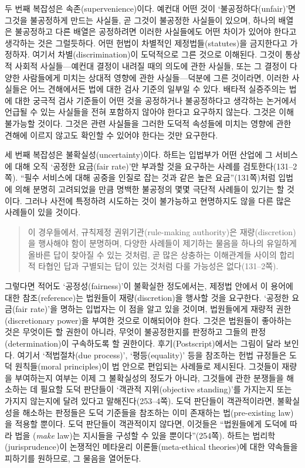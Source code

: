 두 번째 복잡성은 속존(supervenience)이다. 예컨대 어떤 것이
‘불공정하다(unfair)’면 그것을 불공정하게 만드는 사실들, 곧 그것이
불공정한  사실들이 있으며, 하나의
배열은 불공정하고 다른 배열은 공정하려면 이러한 사실들에도 어떤 차이가
있어야 한다고 생각하는 것은 그럴듯하다. 어떤 헌법이 차별적인
제정법들(statutes)을 금지한다고 가정하자. 여기서 차별(discrimination)이
도덕적으로 그른 것으로 이해된다. 그것이 통상적 사회적 사실들---예컨대
결정이 내려질 때의 의도에 관한 사실들, 또는 그 결정이 다양한 사람들에게
미치는 상대적 영향에 관한 사실들---덕분에 그른 것이라면, 이러한 사실들은
어느 견해에서든 법에 대한 검사 기준의 일부일 수 있다. 배타적 실증주의는
법에 대한 궁극적 검사 기준들이 어떤 것을 공정하거나 불공정하다고
생각하는 논거에서 언급될 수 있는 사실들을 전혀 포함하지 않아야 한다고
요구하지 않는다. 그것은 이해 불가능할 것이다. 그것은 관련 사실들을
그러한 도덕적 속성들에 미치는 영향에 관한 견해에 이르지 않고도 확인할 수
있어야 한다는 것만 요구한다.

세 번째 복잡성은 불확실성(uncertainty)이다. 하트는 입법부가 어떤 산업에
그 서비스에 대해 오직 ‘공정한 요금(fair rate)’만 부과할 것을 요구하는
사례를 검토한다(131--2쪽). “필수 서비스에 대해 공중을 인질로 잡는 것과
같은 높은 요금”(131쪽)처럼 입법에 의해 분명히 고려되었을 만큼 명백한
불공정의 몇몇 극단적 사례들이 있기는 할 것이다. 그러나 사전에 특정하려
시도하는 것이 불가능하고 현명하지도 않을 다른 많은 사례들이 있을 것이다.

\begin{quote}
이 경우들에서, 규칙제정 권위기관(rule-making authority)은
재량(discretion)을 행사해야 함이 분명하며, 다양한 사례들이 제기하는
물음을 하나의 유일하게 올바른 답이 찾아질 수 있는 것처럼, 곧 많은
상충하는 이해관계들 사이의 합리적 타협인 답과 구별되는 답이 있는 것처럼
다룰 가능성은 없다(131--2쪽).
\end{quote}

그렇다면 적어도 ‘공정성(fairness)’이 불확실한 정도에서는, 제정법 안에서
이 용어에 대한 참조(reference)는 법원들이 재량(discretion)을 행사할 것을
요구한다. ‘공정한 요금(fair rate)’을 명하는 입법자는 이 점을 알고 있을
것이며, 법원들에게 재량적 권한(discretionary power)을 부여한 것으로
이해되어야 한다. 그것은 법원들이 좋아하는 것은 무엇이든 할 권한이
아니라, 무엇이 불공정한지를 판정하고 그들의 판정(determination)이
구속하도록 할 권한이다. 후기(Postscript)에서는 그림이 달라 보인다.
여기서 ‘적법절차(due process)’, ‘평등(equality)’ 등을 참조하는 헌법
규정들은 도덕 원칙들(moral principles)이 법 안으로 편입되는 사례들로
제시된다. 그것들이 재량을 부여하는지 여부는 이제 그 불확실성의 정도가
아니라, 그것들에 관한 분쟁들을 해소하는 데 필요할 도덕 판단들이 ‘객관적
지위(objective standing)’를 가지는지 또는 가지지 않는지에 달려 있다고
말해진다(253--4쪽). 도덕 판단들이 객관적이라면, 불확실성을 해소하는
판정들은 도덕 기준들을 참조하는 이미 존재하는 법(pre-existing law)을
적용할 뿐이다. 도덕 판단들이 객관적이지 않다면, 이것들은 “법원들에게
도덕에 따라 법을 (\emph{make} law)는 지시들을 구성할 수
있을 뿐이다”(254쪽). 하트는 법리학(jurisprudence)이 논쟁적인 메타윤리
이론들(meta-ethical theories)에 대한 약속들을 피하기를 원하므로, 그
물음을 열어둔다.

